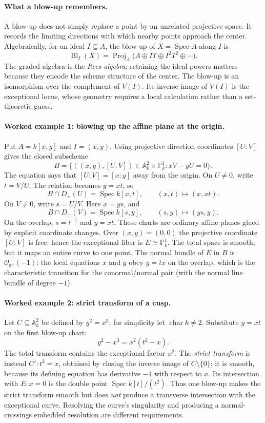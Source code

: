 \paragraph{What a blow-up remembers.}
A blow-up does not simply replace a point by an unrelated projective
space.  It records the limiting directions with which nearby points
approach the center.  Algebraically, for an ideal $I\subseteq A$,
the blow-up of $X=\operatorname{Spec}A$ along $I$ is
\[
 \operatorname{Bl}_I(X)=\operatorname{Proj}_A
 \bigl(A\oplus I T\oplus I^2T^2\oplus\cdots\bigr).
\]
The graded algebra is the \emph{Rees algebra}; retaining the ideal
powers matters because they encode the scheme structure of the center.
The blow-up is an isomorphism over the complement of $V(I)$.  Its
inverse image of $V(I)$ is the exceptional locus, whose geometry
requires a local calculation rather than a set-theoretic guess.

\paragraph{Worked example 1: blowing up the affine plane at the origin.}
Put $A=k[x,y]$ and $I=(x,y)$.  Using projective direction
coordinates $[U:V]$ gives the closed subscheme
\[
 B=\{((x,y),[U:V])\in\mathbb A_k^2\times\mathbb P_k^1:
               xV-yU=0\}.
\]
The equation says that $[U:V]=[x:y]$ away from the origin.
On $U\ne0$, write $t=V/U$.  The relation becomes $y=xt$, so
\[
 B\cap D_+(U)=\operatorname{Spec}k[x,t],\qquad
 (x,t)\longmapsto(x,xt).
\]
On $V\ne0$, write $s=U/V$.  Here $x=ys$, and
\[
 B\cap D_+(V)=\operatorname{Spec}k[s,y],\qquad
 (s,y)\longmapsto(ys,y).
\]
On the overlap, $s=t^{-1}$ and $y=xt$.  These charts are
ordinary affine planes glued by explicit coordinate changes.
Over $(x,y)=(0,0)$ the projective coordinate $[U:V]$ is free;
hence the exceptional fiber is $E\simeq\mathbb P^1_k$.
The total space is smooth, but it maps an entire curve to one point.
The normal bundle of $E$ in $B$ is $\mathcal O_{\mathbb P^1}(-1)$:
the local equations $x$ and $y$ obey $y=tx$ on the overlap,
which is the characteristic transition for the conormal/normal
pair (with the normal line bundle of degree $-1$).

\paragraph{Worked example 2: strict transform of a cusp.}
Let $C\subseteq\mathbb A_k^2$ be defined by
$y^2=x^3$; for simplicity let $\operatorname{char}k\ne2$.
Substitute $y=xt$ on the first blow-up chart:
\[
 y^2-x^3=x^2(t^2-x).
\]
The total transform contains the exceptional factor $x^2$.
The \emph{strict transform} is instead $C':t^2=x$, obtained by
closing the inverse image of $C\setminus\{0\}$; it is smooth,
because its defining equation has derivative $-1$ with respect
to $x$.  Its intersection with $E:x=0$ is the double point
$\operatorname{Spec}k[t]/(t^2)$.  Thus one blow-up makes the
strict transform smooth but does \emph{not} produce a transverse
intersection with the exceptional curve.  Resolving the curve's
singularity and producing a normal-crossings embedded resolution
are different requirements.

